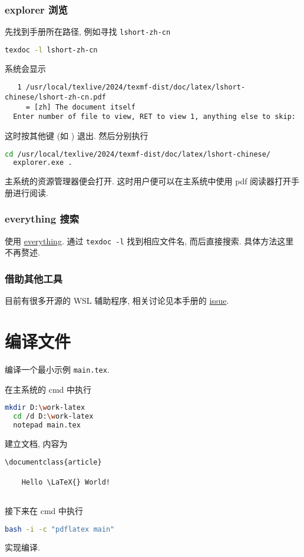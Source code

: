 \subsubsection{explorer 浏览}

先找到手册所在路径,
例如寻找 \texttt{lshort-zh-cn}
\begin{lstlisting}[language=bash]
  texdoc -l lshort-zh-cn
\end{lstlisting}
系统会显示
\begin{lstlisting}
   1 /usr/local/texlive/2024/texmf-dist/doc/latex/lshort-chinese/lshort-zh-cn.pdf
     = [zh] The document itself
  Enter number of file to view, RET to view 1, anything else to skip:
\end{lstlisting}
这时按其他键 (如 ) 退出.
然后分别执行
\begin{lstlisting}[language=bash]
  cd /usr/local/texlive/2024/texmf-dist/doc/latex/lshort-chinese/
  explorer.exe .
\end{lstlisting}
主系统的资源管理器便会打开.
这时用户便可以在主系统中使用 pdf 阅读器打开手册进行阅读.

\subsubsection{everything 搜索}

使用 \href{https://www.voidtools.com/zh-cn/}{everything}.
通过 \texttt{texdoc -l} 找到相应文件名,
而后直接搜索.
具体方法这里不再赘述.

\subsubsection{借助其他工具}

目前有很多开源的 WSL 辅助程序,
相关讨论见本手册的 \href{https://github.com/OsbertWang/install-latex-guide-zh-cn/issues/13}{issue}.

\section{编译文件}

编译一个最小示例 \texttt{main.tex}.

在主系统的 \textsf{cmd} 中执行
\begin{lstlisting}[language=bash]
  mkdir D:\work-latex
  cd /d D:\work-latex
  notepad main.tex
\end{lstlisting}
建立文档,
内容为
\begin{lstlisting}[language = {[LaTeX]TeX}]
  \documentclass{article}
  
    Hello \LaTeX{} World!
  
\end{lstlisting}
接下来在 \textsf{cmd} 中执行
\begin{lstlisting}[language=bash]
  bash -i -c "pdflatex main"
\end{lstlisting}
实现编译.

